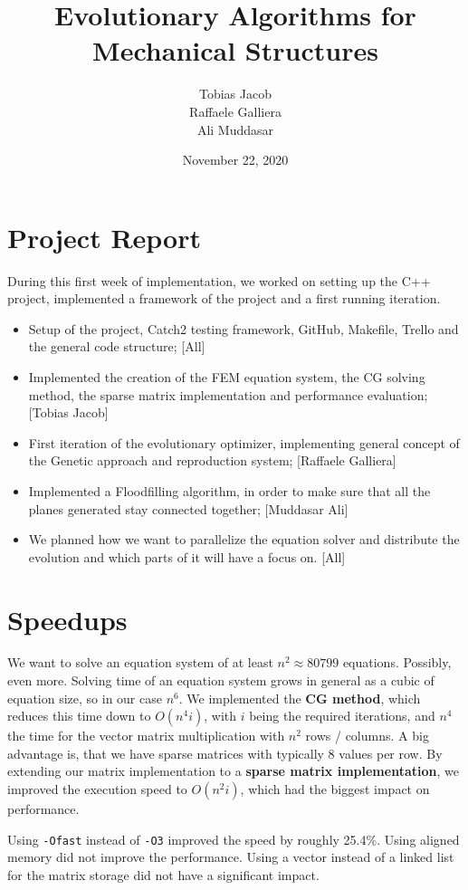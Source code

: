 \documentclass[12pt]{article}
\title{\vspace{-3em} Evolutionary Algorithms for Mechanical Structures}
\author{Tobias Jacob \\ Raffaele Galliera \\ Ali Muddasar}
\date{November 22, 2020}
\begin{document}
\maketitle

\section*{Project Report}
    During this first week of implementation, we worked on setting up the C++ project, implemented a framework of the project and a first running iteration.
\begin{itemize}
    \item Setup of the project, Catch2 testing framework, GitHub, Makefile, Trello and the general code structure; [All]
    \item Implemented the creation of the FEM equation system, the CG solving method, the sparse matrix implementation and performance evaluation; [Tobias Jacob]
    \item First iteration of the evolutionary optimizer, implementing general concept of the Genetic approach and reproduction system; [Raffaele Galliera]
    \item Implemented a Floodfilling algorithm, in order to make sure that all the planes generated stay connected together; [Muddasar Ali]
    \item We planned how we want to parallelize the equation solver and distribute the evolution and which parts of it will have a focus on. [All]
\end{itemize}

\section*{Speedups}

We want to solve an equation system of at least $n^2 \approx 80799$ equations. Possibly, even more. Solving time of an equation system grows in general as a cubic of equation size, so in our case $n^6$. We implemented the \textbf{CG method}, which reduces this time down to $O(n^4 i)$, with $i$ being the required iterations, and $n^4$ the time for the vector matrix multiplication with $n^2$ rows / columns. A big advantage is, that we have sparse matrices with typically 8 values per row. By extending our matrix implementation to a \textbf{sparse matrix implementation}, we improved the execution speed to $O(n^2 i)$, which had the biggest impact on performance.

Using \texttt{-Ofast} instead of \texttt{-O3} improved the speed by roughly 25.4\%. Using aligned memory did not improve the performance. Using a vector instead of a linked list for the matrix storage did not have a significant impact.
\end{document}
